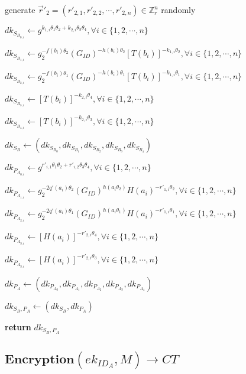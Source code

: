 \documentclass[a4paper]{article}
\begin{document}
generate $\vec{r}'_2 = (r'_{2, 1}, r'_{2, 2}, \cdots, r'_{2, n}) \in \mathbb{Z}_r^n$ randomly

$\textit{dk}_{S_{B_{0, i}}} \gets g^{k_{1, i} \theta_1 \theta_2 + k_{2, i} \theta_3 \theta_4}, \forall i \in \{1, 2, \cdots, n\}$

$\textit{dk}_{S_{B_{1, i}}} \gets g_2^{-f(b_i) \theta_2} (G_{\textit{ID}})^{-h(b_i) \theta_2} [T(b_i)]^{-k_{1, i} \theta_2}, \forall i \in \{1, 2, \cdots, n\}$

$\textit{dk}_{S_{B_{2, i}}} \gets g_2^{-f(b_i) \theta_1} (G_{\textit{ID}})^{-h(b_i) \theta_1} [T(b_i)]^{-k_{1, i} \theta_1}, \forall i \in \{1, 2, \cdots, n\}$

$\textit{dk}_{S_{B_{3, i}}} \gets [T(b_i)]^{-k_{2, i} \theta_4}, \forall i \in \{1, 2, \cdots, n\}$

$\textit{dk}_{S_{B_{4, i}}} \gets [T(b_i)]^{-k_{2, i} \theta_3}, \forall i \in \{1, 2, \cdots, n\}$

$\textit{dk}_{S_B} \gets (\textit{dk}_{S_{B_0}}, \textit{dk}_{S_{B_1}}, \textit{dk}_{S_{B_2}}, \textit{dk}_{S_{B_3}}, \textit{dk}_{S_{B_4}})$

$\textit{dk}_{P_{A_{0, i}}} \gets g^{r'_{i, 1} \theta_1 \theta_2 + r'_{i, 2} \theta_3 \theta_4}, \forall i \in \{1, 2, \cdots, n\}$

$\textit{dk}_{P_{A_{1, i}}} \gets g_2^{-2q'(a_i) \theta_2} (G_{\textit{ID}})^{h(a_i \theta_2)} H(a_i)^{-r'_{1, i} \theta_2}, \forall i \in \{1, 2, \cdots, n\}$

$\textit{dk}_{P_{A_{2, i}}} \gets g_2^{-2q'(a_i) \theta_1} (G_{\textit{ID}})^{h(a_i \theta_1)} H(a_i)^{-r'_{1, i} \theta_1}, \forall i \in \{1, 2, \cdots, n\}$

$\textit{dk}_{P_{A_{3, i}}} \gets [H(a_i)]^{-r'_{2, i} \theta_4}, \forall i \in \{1, 2, \cdots, n\}$

$\textit{dk}_{P_{A_{3, i}}} \gets [H(a_i)]^{-r'_{2, i} \theta_3}, \forall i \in \{1, 2, \cdots, n\}$

$\textit{dk}_{P_A} \gets (\textit{dk}_{P_{A_0}}, \textit{dk}_{P_{A_1}}, \textit{dk}_{P_{A_2}}, \textit{dk}_{P_{A_3}}, \textit{dk}_{P_{A_4}})$

$\textit{dk}_{S_B, P_A} \gets (\textit{dk}_{S_B}, \textit{dk}_{P_A})$

\textbf{return} $\textit{dk}_{S_B, P_A}$

\subsection{$\textbf{Encryption}(\textit{ek}_{\textit{ID}_A}, M) \rightarrow \textit{CT}$}
\end{document}

